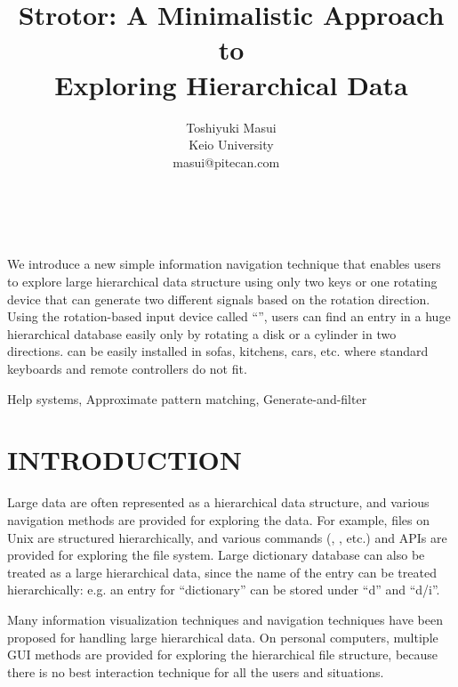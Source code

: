 \documentclass{article}
\begin{document}
\title{Strotor: A Minimalistic Approach to \\
Exploring Hierarchical Data}
\author{
\begin{tabular}{l}
\parbox{5.5cm}{
\begin{center}
Toshiyuki Masui\\
Keio University\\
masui@pitecan.com
~ \\
~ \\
~
\end{center}
}
\end{tabular}
}
\maketitle
\abstract
We introduce a new simple information navigation technique
that enables users to explore large hierarchical data structure
using only two keys or one rotating device that can generate
two different signals based on the rotation direction.
%
Using the rotation-based input device called ``\ST'',
users can find an entry in a huge hierarchical database easily
only by rotating a disk or a cylinder in two directions.
%
{\ST} can be easily installed in sofas, kitchens, cars, etc.
where standard keyboards and remote controllers do not fit.

\keywords Help systems, Approximate pattern matching, Generate-and-filter


\section*{INTRODUCTION}

Large data are often represented as a hierarchical data structure, and
various navigation methods are provided for exploring the data.
For example, files on Unix are structured hierarchically, and
various commands (, , etc.) and APIs are provided for exploring the file system.
Large dictionary database can also be treated as a large
hierarchical data, since the name of the entry can be treated hierarchically:
e.g. an entry for ``dictionary'' can be stored under ``d'' and ``d/i''.

Many information visualization techniques and navigation techniques
have been proposed for handling large hierarchical data.
On personal computers,
multiple GUI methods are provided for
exploring the hierarchical file structure, because
there is no best interaction technique for all the users and situations.
\end{document}
